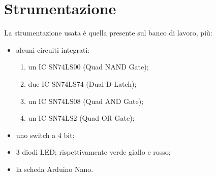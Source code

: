 \section{Strumentazione}
La strumentazione usata è quella presente sul banco di lavoro, più:
	\begin{itemize}
		\item alcuni circuiti integrati:
		\begin{enumerate}
			\item un IC SN74LS00 (Quad NAND Gate);
			\item due IC SN74LS74 (Dual D-Latch);
			\item un IC SN74LS08 (Quad AND Gate);
			\item un IC SN74LS2 (Quad OR Gate);
		\end{enumerate}
		\item uno switch a 4 bit;
		\item 3 diodi LED; rispettivamente verde giallo e rosso;
		\item la scheda Arduino Nano.
	\end{itemize}

